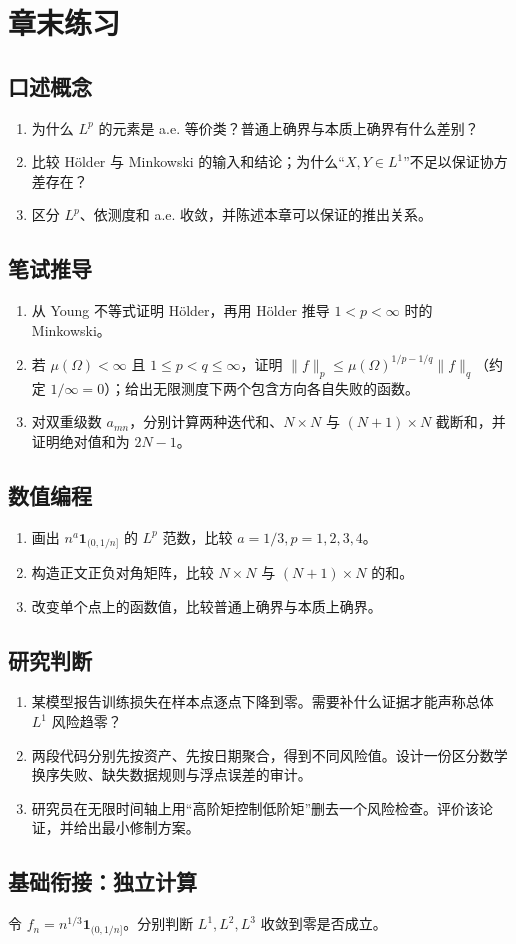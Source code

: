 \section*{章末练习}
\begingroup\small
\subsection*{口述概念}
\begin{enumerate}[nosep,leftmargin=*]
  \item 为什么 $L^p$ 的元素是 a.e. 等价类？普通上确界与本质上确界有什么差别？
  \item 比较 Hölder 与 Minkowski 的输入和结论；为什么“$X,Y\in L^1$”不足以保证协方差存在？
  \item 区分 $L^p$、依测度和 a.e. 收敛，并陈述本章可以保证的推出关系。
\end{enumerate}

\subsection*{笔试推导}
\begin{enumerate}[nosep,leftmargin=*]
  \item 从 Young 不等式证明 Hölder，再用 Hölder 推导 $1<p<\infty$ 时的 Minkowski。
  \item 若 $\mu(\Omega)<\infty$ 且 $1\leq p<q\leq\infty$，证明 $\lVert f\rVert_p\leq\mu(\Omega)^{1/p-1/q}\lVert f\rVert_q$（约定 $1/\infty=0$）；给出无限测度下两个包含方向各自失败的函数。
  \item 对双重级数 $a_{mn}$，分别计算两种迭代和、$N\times N$ 与 $(N+1)\times N$ 截断和，并证明绝对值和为 $2N-1$。
\end{enumerate}

\subsection*{数值编程}
\begin{enumerate}[leftmargin=*]
  \item 画出 $n^a\mathbf1_{(0,1/n]}$ 的 $L^p$ 范数，比较 $a=1/3,p=1,2,3,4$。
  \item 构造正文正负对角矩阵，比较 $N\times N$ 与 $(N+1)\times N$ 的和。
  \item 改变单个点上的函数值，比较普通上确界与本质上确界。
\end{enumerate}

\subsection*{研究判断}
\begin{enumerate}[nosep,leftmargin=*]
  \item 某模型报告训练损失在样本点逐点下降到零。需要补什么证据才能声称总体 $L^1$ 风险趋零？
  \item 两段代码分别先按资产、先按日期聚合，得到不同风险值。设计一份区分数学换序失败、缺失数据规则与浮点误差的审计。
  \item 研究员在无限时间轴上用“高阶矩控制低阶矩”删去一个风险检查。评价该论证，并给出最小修制方案。
\end{enumerate}
\endgroup

\subsection*{基础衔接：独立计算}
令 $f_n=n^{1/3}\mathbf1_{(0,1/n]}$。分别判断 $L^1,L^2,L^3$ 收敛到零是否成立。
